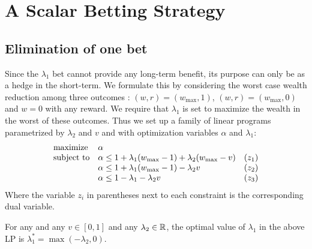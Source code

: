 \section{A Scalar Betting Strategy}
\subsection{Elimination of one bet} \label{app:betaopt}
Since the $\lambda_1$ bet cannot provide any long-term benefit, its purpose can only be as a hedge in the short-term. We formulate this by considering the
worst case wealth reduction among three outcomes :
$(w,r)=(w_{\max},1)$, 
$(w,r)=(w_{\max},0)$ and $w=0$ with any reward. We require that $\lambda_1$
is set to maximize the wealth in the worst of these outcomes. Thus we set 
up a family of linear programs parametrized by $\lambda_2$ and $v$ and with optimization variables $\alpha$ and $\lambda_1$:
\begin{equation*}
\begin{array}{ll@{}ll}
\text{maximize}  & \alpha &\\
\text{subject to}& \alpha \leq 1+\lambda_1(w_{\max}-1)+\lambda_2(w_{\max}-v)  & &(z_1) \\
                 & \alpha \leq 1+\lambda_1(w_{\max}-1)-\lambda_2 v            & &(z_2) \\
                 & \alpha \leq 1-\lambda_1-\lambda_2 v                        & &(z_3) \\
\end{array}
\end{equation*}
Where the variable $z_i$ in parentheses next to each constraint is the corresponding dual variable. 
\begin{theorem}
For any  and any $v\in [0,1]$ and any $\lambda_2 \in \mathbb{R}$, the optimal value of $\lambda_1$ in the above LP is $\lambda_1^*=\max(-\lambda_2,0)$.
\end{theorem}
